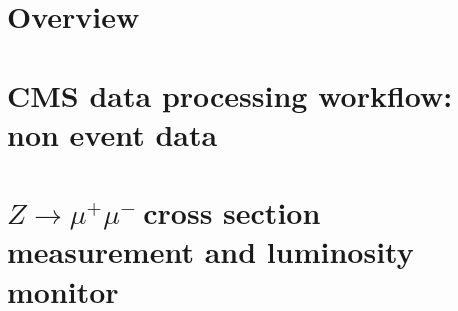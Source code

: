 \documentclass[a4paper,12pt]{book}
\newcommand{\Zmm}{$Z\rightarrow \mu^+ \mu^- \:$}
\begin{document}
 \listoftables
\newpage


\clearpage{\pagestyle{empty}\cleardoublepage} \thispagestyle{empty}

\part{Overview}




\part{CMS data processing workflow: non event data}


\part{\Zmm cross section measurement and luminosity monitor}




%

\end{document}
